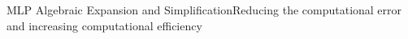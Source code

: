 \documentclass[a4paper,landscape]{article}
\begin{document}
\begin{baylortitle}{MLP Algebraic Expansion and Simplification}{}{Reducing the computational error and increasing computational efficiency}{}{}\end{baylortitle}
\end{document}
